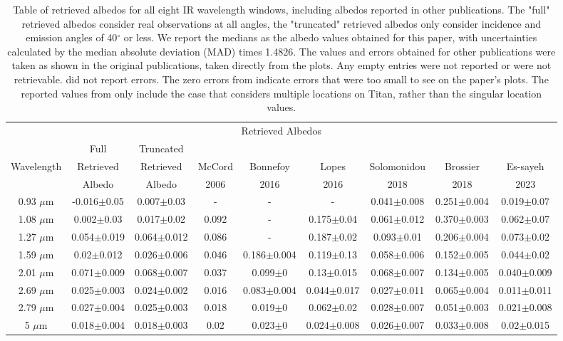\documentclass[twocolumn,linenumbers]{aastex631}
\begin{document}
\begin{table}[htbp]

\centering

\begin{tabular}{ccccccccc}

\multicolumn{9}{c}{Retrieved Albedos} \\

  & Full & Truncated &  &  &  &  &  & \\
Wavelength & Retrieved & Retrieved & McCord & Bonnefoy & Lopes & Solomonidou & Brossier & Es-sayeh\\
  & Albedo & Albedo & 2006 & 2016 & 2016 & 2018 & 2018 & 2023\\
\hline
0.93 $\mu$m & -0.016$\pm$0.05 & 0.007$\pm$0.03  & - & - & - & 0.041$\pm$0.008 & 0.251$\pm$0.004 & 0.019$\pm$0.07\\
\hline
1.08 $\mu$m & 0.002$\pm$0.03 & 0.017$\pm$0.02 & 0.092 & - & 0.175$\pm$0.04 &  0.061$\pm$0.012 & 0.370$\pm$0.003 & 0.062$\pm$0.07\\
\hline
1.27 $\mu$m & 0.054$\pm$0.019 & 0.064$\pm$0.012 & 0.086 & - & 0.187$\pm$0.02 & 0.093$\pm$0.01 & 0.206$\pm$0.004 & 0.073$\pm$0.02\\
\hline
1.59 $\mu$m & 0.02$\pm$0.012 & 0.026$\pm$0.006 & 0.046 & 0.186$\pm$0.004 & 0.119$\pm$0.13 & 0.058$\pm$0.006 & 0.152$\pm$0.005 & 0.044$\pm$0.02\\
\hline
2.01 $\mu$m & 0.071$\pm$0.009 & 0.068$\pm$0.007 & 0.037 & 0.099$\pm$0 & 0.13$\pm$0.015 & 0.068$\pm$0.007 & 0.134$\pm$0.005 & 0.040$\pm$0.009\\
\hline
2.69 $\mu$m & 0.025$\pm$0.003 & 0.024$\pm$0.002 & 0.016 & 0.083$\pm$0.004 & 0.044$\pm$0.017 & 0.027$\pm$0.011 & 0.065$\pm$0.004 & 0.011$\pm$0.011\\
\hline
2.79 $\mu$m & 0.027$\pm$0.004 & 0.025$\pm$0.003 & 0.018 & 0.019$\pm$0 & 0.062$\pm$0.02 & 0.028$\pm$0.007 & 0.051$\pm$0.003 & 0.021$\pm$0.008\\
\hline
5 $\mu$m & 0.018$\pm$0.004 & 0.018$\pm$0.003 & 0.02 & 0.023$\pm$0& 0.024$\pm$0.008 & 0.026$\pm$0.007 & 0.033$\pm$0.008 & 0.02$\pm$0.015\\
\hline

\end{tabular}

\caption{Table of retrieved albedos for all eight IR wavelength windows, including albedos reported in other publications. The "full" retrieved albedos consider real observations at all angles, the "truncated" retrieved albedos only consider incidence and emission angles of 40$^{\circ}$ or less. We report the medians as the albedo values obtained for this paper, with uncertainties calculated by the median absolute deviation (MAD) times 1.4826. The values and errors obtained for other publications were taken as shown in the original publications, taken directly from the plots. Any empty entries were not reported or were not retrievable. \cite{McCord2006} did not report errors. The zero errors from \cite{Bonnefoy2016} indicate errors that were too small to see on the paper's plots. The reported values from \cite{Solomonidou2018} only include the case that considers multiple locations on Titan, rather than the singular location values.}


\end{table}
\end{document}
